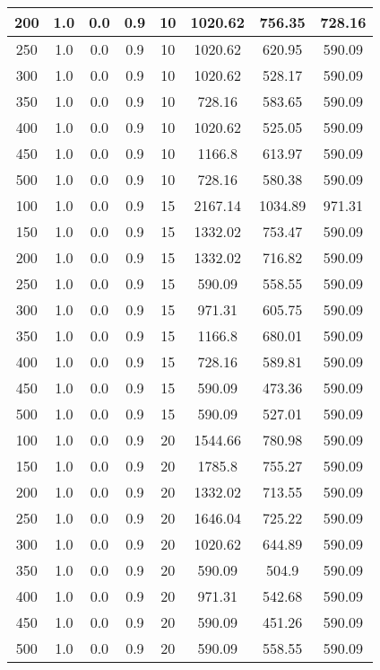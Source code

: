 \documentclass[a4paper, 12pt]{extreport}
\begin{document}
\begin{itemize}
\begin{longtable}{|c|c|c|c|c|c|c|c|}
			200 & 1.0 & 0.0 & 0.9 & 10 & 1020.62 & 756.35 & 728.16 \\\hline
			250 & 1.0 & 0.0 & 0.9 & 10 & 1020.62 & 620.95 & 590.09 \\\hline
			300 & 1.0 & 0.0 & 0.9 & 10 & 1020.62 & 528.17 & 590.09 \\\hline
			350 & 1.0 & 0.0 & 0.9 & 10 & 728.16 & 583.65 & 590.09 \\\hline
			400 & 1.0 & 0.0 & 0.9 & 10 & 1020.62 & 525.05 & 590.09 \\\hline
			450 & 1.0 & 0.0 & 0.9 & 10 & 1166.8 & 613.97 & 590.09 \\\hline
			500 & 1.0 & 0.0 & 0.9 & 10 & 728.16 & 580.38 & 590.09 \\\hline
			100 & 1.0 & 0.0 & 0.9 & 15 & 2167.14 & 1034.89 & 971.31 \\\hline
			150 & 1.0 & 0.0 & 0.9 & 15 & 1332.02 & 753.47 & 590.09 \\\hline
			200 & 1.0 & 0.0 & 0.9 & 15 & 1332.02 & 716.82 & 590.09 \\\hline
			250 & 1.0 & 0.0 & 0.9 & 15 & 590.09 & 558.55 & 590.09 \\\hline
			300 & 1.0 & 0.0 & 0.9 & 15 & 971.31 & 605.75 & 590.09 \\\hline
			350 & 1.0 & 0.0 & 0.9 & 15 & 1166.8 & 680.01 & 590.09 \\\hline
			400 & 1.0 & 0.0 & 0.9 & 15 & 728.16 & 589.81 & 590.09 \\\hline
			450 & 1.0 & 0.0 & 0.9 & 15 & 590.09 & 473.36 & 590.09 \\\hline
			500 & 1.0 & 0.0 & 0.9 & 15 & 590.09 & 527.01 & 590.09 \\\hline
			100 & 1.0 & 0.0 & 0.9 & 20 & 1544.66 & 780.98 & 590.09 \\\hline
			150 & 1.0 & 0.0 & 0.9 & 20 & 1785.8 & 755.27 & 590.09 \\\hline
			200 & 1.0 & 0.0 & 0.9 & 20 & 1332.02 & 713.55 & 590.09 \\\hline
			250 & 1.0 & 0.0 & 0.9 & 20 & 1646.04 & 725.22 & 590.09 \\\hline
			300 & 1.0 & 0.0 & 0.9 & 20 & 1020.62 & 644.89 & 590.09 \\\hline
			350 & 1.0 & 0.0 & 0.9 & 20 & 590.09 & 504.9 & 590.09 \\\hline
			400 & 1.0 & 0.0 & 0.9 & 20 & 971.31 & 542.68 & 590.09 \\\hline
			450 & 1.0 & 0.0 & 0.9 & 20 & 590.09 & 451.26 & 590.09 \\\hline
			500 & 1.0 & 0.0 & 0.9 & 20 & 590.09 & 558.55 & 590.09 \\\hline

\end{longtable}
\end{itemize}
\end{document}
